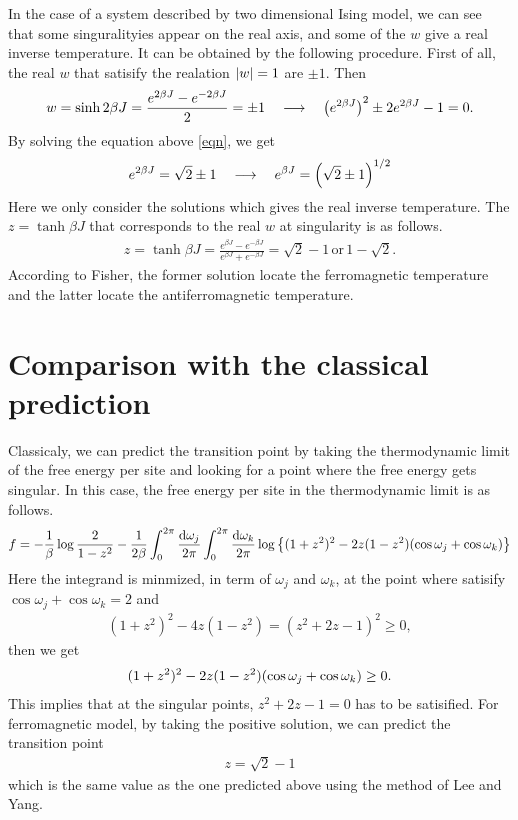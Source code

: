 \documentclass[aps, 12pt]{revtex4-2}
\begin{document}
In the case of a system described by two dimensional Ising model, we can see that some singuralityies appear on the real axis, and some of the $w$ give a real inverse temperature. It can be obtained by the following procedure. First of all, the real $w$ that satisify the realation $\qty|w| = 1$ are $\pm 1$. Then
\begin{align}
  w = \sinh 2\beta J = \frac{e^{2\beta J} - e^{-2\beta J}}{2} = \pm 1 \quad \longrightarrow \quad \qty(e^{2\beta J})^2 \pm 2 e^{2\beta J} - 1= 0. \label{eqn}
\end{align}
By solving the equation above \eqref{eqn}, we get
\begin{align}
  e^{2\beta J} = \sqrt{2} \pm 1 \quad \longrightarrow \quad e^{\beta J} = \qty(\sqrt{2} \pm 1)^{1/2}
\end{align}
Here we only consider the solutions which gives the real inverse temperature. The $z = \tanh \beta J$ that corresponds to the real $w$ at singularity is as follows.
\begin{align}
  z = \tanh \beta J = \frac{e^{\beta J} - e^{-\beta J}}{e^{\beta J} + e^{-\beta J}} = \sqrt{2} - 1 \, \mathrm{or} \, 1 - \sqrt{2}.
\end{align}
According to Fisher, the former solution locate the ferromagnetic temperature and the latter locate the antiferromagnetic temperature.

\section{Comparison with the classical prediction}
Classicaly, we can predict the transition point by taking the thermodynamic limit of the free energy per site and looking for a point where the free energy gets singular. In this case, the free energy per site in the thermodynamic limit is as follows.
\begin{align}
  f = -\frac{1}{\beta} \log \frac{2}{1 - z^2} - \frac{1}{2\beta} \int_0^{2\pi} \frac{\dd \omega_j}{2\pi} \int_0^{2\pi} \frac{\dd \omega_k}{2\pi} \log \qty{(1 + z^2)^2 - 2z(1 - z^2)\qty(\cos \omega_j + \cos \omega_k)}
\end{align}
Here the integrand is minmized, in term of $\omega_j$ and $\omega_k$, at the point where satisify $\cos \omega_j + \cos \omega_k = 2$ and
\begin{align}
  (1 + z^2)^2 - 4z(1 - z^2) = (z^2 + 2z - 1)^2 \geq 0,
\end{align}
then we get
\begin{align}
  (1 + z^2)^2 - 2z(1 - z^2)\qty(\cos \omega_j + \cos \omega_k) \geq 0.
\end{align}
This implies that at the singular points, $z^2 + 2z - 1 = 0$ has to be satisified. For ferromagnetic model, by taking the positive solution, we can predict the transition point
\begin{align}
  z = \sqrt{2} - 1
\end{align}
which is the same value as the one predicted above using the method of Lee and Yang.

\end{document}

